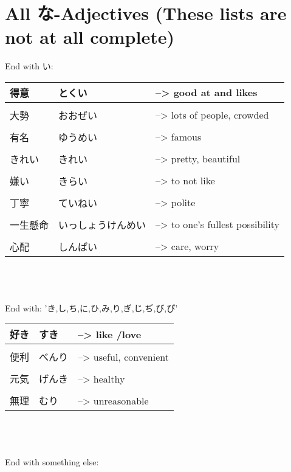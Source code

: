 \documentclass{article}
\begin{document}


\section{All な-Adjectives (These lists are not at all complete)}
End with い: \\
\begin{tabular}{ l | l l }
得意&とくい&--> good at and likes \\ \hline\\[-1em]
大勢 &おおぜい&--> lots of people, crowded\\ \hline\\[-1em]
有名 &ゆうめい&--> famous\\ \hline\\[-1em]
きれい &きれい&--> pretty, beautiful \\ \hline\\[-1em]
嫌い&きらい&--> to not like\\ \hline\\[-1em]
丁寧 &ていねい &--> polite\\ \hline\\[-1em]
一生懸命&いっしょうけんめい&--> to one’s fullest possibility\\ \hline\\[-1em]
心配&しんぱい&--> care, worry %
\end{tabular} \\ \\ \\
End with: 'き,し,ち,に,ひ,み,り,ぎ,じ,ぢ,び,ぴ' \\
\begin{tabular}{ l | l l }
好き&すき&--> like /love\\ \hline\\[-1em]
便利&べんり&--> useful, convenient\\ \hline\\[-1em]
元気&げんき&--> healthy\\ \hline\\[-1em]
無理 	&むり 	&--> unreasonable %
\end{tabular} \\ \\ \\
End with something else: \\
\end{document}
